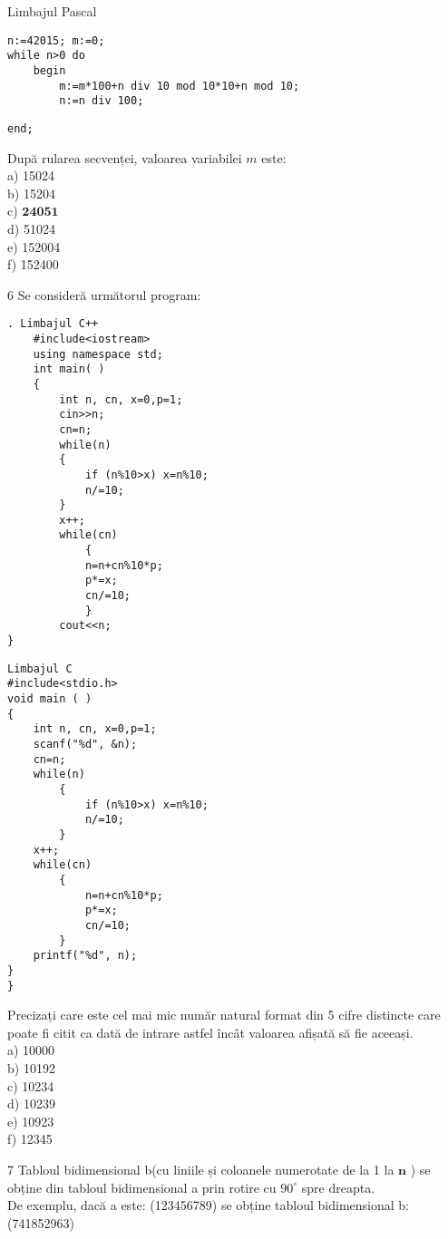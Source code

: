 Limbajul Pascal

\begin{verbatim}
n:=42015; m:=0;
while n>0 do
    begin
        m:=m*100+n div 10 mod 10*10+n mod 10;
        n:=n div 100;
\end{verbatim}

\begin{verbatim}
end;
\end{verbatim}

După rularea secvenței, valoarea variabilei $m$ este:\\
a) 15024\\
b) 15204\\
c) $\mathbf{2 4 0 5 1}$\\
d) 51024\\
e) 152004\\
f) 152400

6 Se consideră următorul program:

\begin{verbatim}
. Limbajul C++
    #include<iostream>
    using namespace std;
    int main( )
    {
        int n, cn, x=0,p=1;
        cin>>n;
        cn=n;
        while(n)
        {
            if (n%10>x) x=n%10;
            n/=10;
        }
        x++;
        while(cn)
            {
            n=n+cn%10*p;
            p*=x;
            cn/=10;
            }
        cout<<n;
}
\end{verbatim}

\begin{verbatim}
Limbajul C
#include<stdio.h>
void main ( )
{
    int n, cn, x=0,p=1;
    scanf("%d", &n);
    cn=n;
    while(n)
        {
            if (n%10>x) x=n%10;
            n/=10;
        }
    x++;
    while(cn)
        {
            n=n+cn%10*p;
            p*=x;
            cn/=10;
        }
    printf("%d", n);
}
}
\end{verbatim}

Precizați care este cel mai mic număr natural format din 5 cifre distincte care poate fi citit ca dată de intrare astfel încât valoarea afișată să fie aceeași.\\
a) 10000\\
b) 10192\\
c) 10234\\
d) 10239\\
e) 10923\\
f) 12345

7 Tabloul bidimensional b(cu liniile și coloanele numerotate de la 1 la $\mathbf{n}$ ) se obține din tabloul bidimensional a prin rotire cu $90^{\circ}$ spre dreapta.\\
De exemplu, dacă a este: (123456789) se obține tabloul bidimensional b:\\
(741852963)

